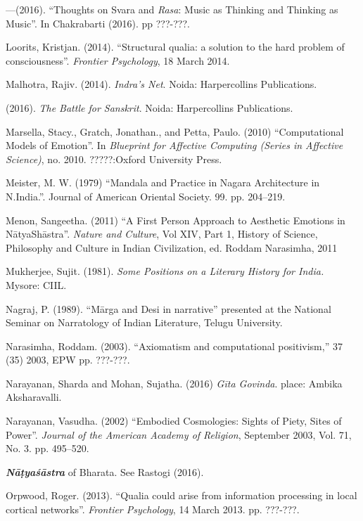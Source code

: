 \begin{thebibliography}{99}
---\kern3pt(2016). “Thoughts on Svara and \textsl{Rasa}: Music as Thinking and Thinking as Music”. In Chakrabarti (2016). pp ???-???.

Loorits, Kristjan. (2014). “Structural qualia: a solution to the hard problem of consciousness”. \textsl{Frontier Psychology}, 18 March 2014.

Malhotra, Rajiv. (2014). \textsl{Indra’s Net}. Noida: Harpercollins Publications.

\kern3pt(2016). \textsl{The Battle for Sanskrit}. Noida: Harpercollins Publications.

Marsella, Stacy., Gratch, Jonathan., and Petta, Paulo. (2010) “Computational Models of Emotion”. In \textsl{Blueprint for Affective Computing (Series in Affective Science)}, no. 2010. ?????:Oxford University Press.

Meister, M. W. (1979) “Mandala and Practice in Nagara Architecture in N.India.”. Journal of American Oriental Society. 99. pp. 204--219.

Menon, Sangeetha. (2011) “A First Person Approach to Aesthetic Emotions in NātyaShāstra”. \textsl{Nature and Culture}, Vol XIV, Part 1, History of Science, Philosophy and Culture in Indian Civilization, ed. Roddam Narasimha, 2011

Mukherjee, Sujit. (1981). \textsl{Some Positions on a Literary History for India.} Mysore: CIIL.

Nagraj, P. (1989). “Mārga and Desi in narrative” presented at the National Seminar on Narratology of Indian Literature, Telugu University.

Narasimha, Roddam. (2003). “Axiomatism and computational positivism,” 37 (35) 2003, EPW pp. ???-???.

Narayanan, Sharda and Mohan, Sujatha. (2016) \textsl{Gīta Govinda}. place: Ambika Aksharavalli.

Narayanan, Vasudha. (2002) “Embodied Cosmologies: Sights of Piety, Sites of Power”. \textsl{Journal of the American Academy of Religion}, September 2003, Vol. 71, No. 3. pp. 495--520.

{\sl\bfseries Nāṭyaśāstra} of Bharata. See Rastogi (2016).

Orpwood, Roger. (2013). “Qualia could arise from information processing in local cortical networks”. \textsl{Frontier Psychology}, 14 March 2013. pp. ???-???.


\end{thebibliography}
